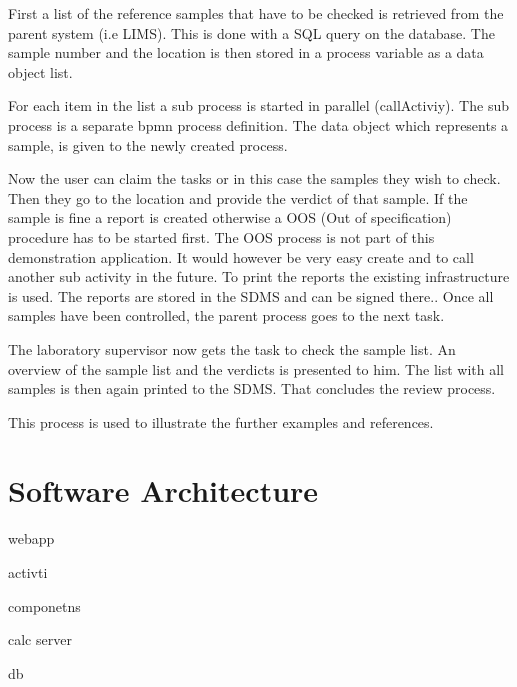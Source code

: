 \documentclass[paper=a4,twoside=false,BCOR=0mm,DIV=calc,fontsize=12pt]{scrartcl}
\begin{document}
First a list of the reference samples that have to be checked is retrieved from the parent system (i.e LIMS). This is done with a SQL query on the database. 
The sample number and the location is then stored in a process variable as a data object list.

For each item in the list a sub process is started in parallel (callActiviy). The sub process is a separate bpmn process definition.
The data object which represents a sample, is given to the newly created process.

Now the user can claim the tasks or in this case the samples they wish to check. Then they go to the location and provide the verdict of that sample. If the sample is fine a report is created otherwise a OOS (Out of specification) procedure has to be started first. The OOS process is not part of this demonstration application. It would however be very easy create and to call another sub activity in the future.
To print the reports the existing infrastructure is used. The reports are stored in the SDMS and can be signed there..
Once all samples have been controlled, the parent process goes to the next task.

The laboratory supervisor now gets the task to check the sample list. An overview of the sample list and the verdicts is presented to him.
The list with all samples is then again printed to the SDMS. That concludes the review process.

This process is used to illustrate the further examples and references.





\section{Software Architecture}

webapp

activti 

componetns

calc server

db
\end{document}
